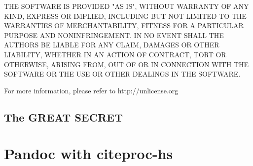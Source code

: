 \documentclass[9pt,twocolumn]{article}
\newcommand{\said}[1]{\citet*{#1}}
\begin{document}
THE SOFTWARE IS PROVIDED "AS IS", WITHOUT WARRANTY OF ANY KIND,
EXPRESS OR IMPLIED, INCLUDING BUT NOT LIMITED TO THE WARRANTIES OF
MERCHANTABILITY, FITNESS FOR A PARTICULAR PURPOSE AND NONINFRINGEMENT.
IN NO EVENT SHALL THE AUTHORS BE LIABLE FOR ANY CLAIM, DAMAGES OR
OTHER LIABILITY, WHETHER IN AN ACTION OF CONTRACT, TORT OR OTHERWISE,
ARISING FROM, OUT OF OR IN CONNECTION WITH THE SOFTWARE OR THE USE OR
OTHER DEALINGS IN THE SOFTWARE.

For more information, please refer to http://unlicense.org


\newpage




\newpage



\subsection*{The GREAT SECRET}



\section{Pandoc with citeproc-hs}\label{pandoc-with-citeproc-hs}

\said{item3}


\end{document}
